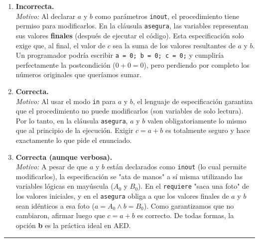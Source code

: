 \begin{enumerate}[label=\textbf{\alph*)}]

    \item \textbf{Incorrecta.} \\
    \textit{Motivo:} Al declarar $a$ y $b$ como parámetros \texttt{inout}, el procedimiento tiene permiso para modificarlos. En la cláusula \texttt{asegura}, las variables representan sus valores \textbf{finales} (después de ejecutar el código). Esta especificación solo exige que, al final, el valor de $c$ sea la suma de los valores resultantes de $a$ y $b$. Un programador podría escribir \texttt{a = 0; b = 0; c = 0;} y cumpliría perfectamente la postcondición ($0 + 0 = 0$), pero perdiendo por completo los números originales que queríamos sumar.

    \vspace{0.4cm}
    \item \textbf{Correcta.} \\
    \textit{Motivo:} Al usar el modo \texttt{in} para $a$ y $b$, el lenguaje de especificación garantiza que el procedimiento no puede modificarlos (son variables de solo lectura). Por lo tanto, en la cláusula \texttt{asegura}, $a$ y $b$ valen obligatoriamente lo mismo que al principio de la ejecución. Exigir $c = a + b$ es totalmente seguro y hace exactamente lo que pide el enunciado.

    \vspace{0.4cm}
    \item \textbf{Correcta (aunque verbosa).} \\
    \textit{Motivo:} A pesar de que $a$ y $b$ están declarados como \texttt{inout} (lo cual permite modificarlos), la especificación se "ata de manos" a sí misma utilizando las variables lógicas en mayúscula ($A_0$ y $B_0$). En el \texttt{requiere} "saca una foto" de los valores iniciales, y en el \texttt{asegura} obliga a que los valores finales de $a$ y $b$ sean idénticos a esa foto ($a = A_0 \wedge b = B_0$). Como garantizamos que no cambiaron, afirmar luego que $c = a + b$ es correcto. De todas formas, la opción \textbf{b} es la práctica ideal en AED.

\end{enumerate}

\vspace{0.5cm}
\hrule
\vspace{0.5cm}